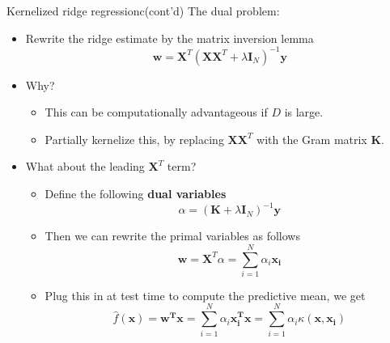 \documentclass[10pt,mathserif]{beamer}
\begin{document}
\begin{frame}{Kernelized ridge regressionc(cont'd)}
The dual problem:
\begin{itemize}
    \item Rewrite the ridge estimate by the matrix inversion lemma
    \begin{equation*}
        \bm{w} = \bm{X}^T(\bm{X}\bm{X}^T +\lambda \bm{I}_N)^{-1}\bm{y} 
    \end{equation*}
    \item Why?
    \begin{itemize}
        \item This can be computationally advantageous if $D$ is large.
        \item Partially kernelize this, by replacing $\bm{X}\bm{X}^T$ with the Gram matrix $\bm{K}$.
    \end{itemize}
    \item What about the leading $\bm{X}^T$ term?
    \begin{itemize}
        \item Define the following \textbf{dual variables}
        \begin{equation*}
            \alpha =  (\bm{K} + \lambda \bm{I}_N)^{-1}\bm{y}
        \end{equation*}
        \item  Then we can rewrite the primal variables as follows
    \begin{equation*}
        \bm{w} = \bm{X}^T\alpha = \sum_{i=1}^N \alpha_i \bm{\bm{x}_i}
    \end{equation*}
    \item  Plug this in at test time to compute the predictive mean, we get
        \begin{equation*}
            \hat{f}(\bm{x}) = \bm{w^T x} = \sum_{i=1}^N \alpha_i \bm{\bm{x}_i^T x} = \sum_{i=1}^N \alpha_i\kappa(\bm{x,\bm{x}_i})
        \end{equation*}
    \end{itemize}
\end{itemize}
\end{frame}
\end{document}
